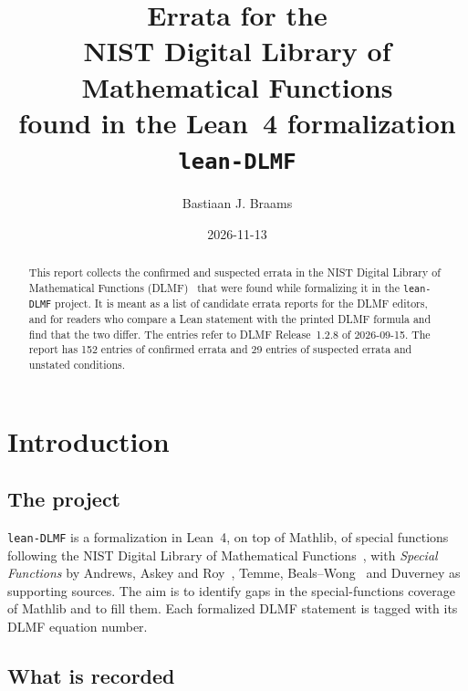 \documentclass[11pt,a4paper]{article}
\newcommand{\NumA}{152}
\newcommand{\NumB}{29}
\begin{document}
\title{Errata for the\\
  NIST Digital Library of Mathematical Functions\\[0.4ex]
  \large found in the Lean~4 formalization \texttt{lean-DLMF}}
\author{Bastiaan J. Braams}
\date{2026-11-13}
\maketitle

\begin{abstract}
  This report collects the confirmed and suspected errata in the NIST Digital Library of
  Mathematical Functions (DLMF)~\cite{DLMF} that were found while formalizing it in the
  \texttt{lean-DLMF} project. It is meant as a list of candidate errata reports for the DLMF
  editors, and for readers who compare a Lean statement with the printed DLMF formula and find
  that the two differ. The entries refer to DLMF Release~1.2.8 of 2026-09-15. The report has
  \NumA{} entries of confirmed errata and \NumB{} entries of suspected errata and unstated
  conditions.
\end{abstract}

\tableofcontents

\section{Introduction}

\subsection{The project}

\texttt{lean-DLMF} is a formalization in Lean~4, on top of Mathlib, of special functions
following the NIST Digital Library of Mathematical Functions~\cite{DLMF}, with
\emph{Special Functions} by Andrews, Askey and Roy~\cite{AAR}, Temme, Beals--Wong~\cite{BealsWong}
and Duverney as supporting sources. The aim is to identify gaps in the special-functions
coverage of Mathlib and to fill them. Each formalized DLMF statement is tagged with its DLMF
equation number.

\subsection{What is recorded}
\end{document}
